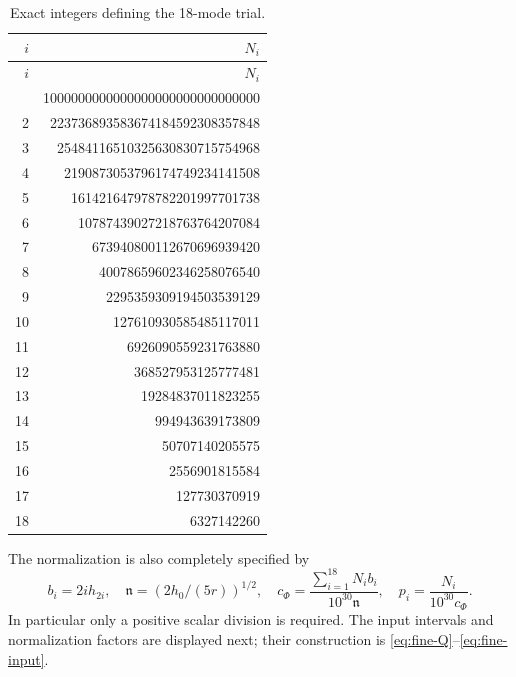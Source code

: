 {\small
\setlength{\tabcolsep}{3pt}
\begin{longtable}{rr}
\caption{Exact integers defining the 18-mode trial.}\label{tab:trial-integers}\\
\toprule $i$ & $N_i$\\ \midrule
\endfirsthead
\toprule $i$ & $N_i$\\ \midrule
\endhead
\bottomrule\endfoot
1 & 1000000000000000000000000000000\\
2 & 223736893583674184592308357848\\
3 & 25484116510325630830715754968\\
4 & 2190873053796174749234141508\\
5 & 161421647978782201997701738\\
6 & 10787439027218763764207084\\
7 & 673940800112670696939420\\
8 & 40078659602346258076540\\
9 & 2295359309194503539129\\
10 & 127610930585485117011\\
11 & 6926090559231763880\\
12 & 368527953125777481\\
13 & 19284837011823255\\
14 & 994943639173809\\
15 & 50707140205575\\
16 & 2556901815584\\
17 & 127730370919\\
18 & 6327142260\\
\end{longtable}
}

The normalization is also completely specified by
\[
 b_i=2ih_{2i},\quad \mathfrak n=(2h_0/(5r))^{1/2},\quad
 c_\Phi=\frac{\sum_{i=1}^{18}N_ib_i}{10^{30}\mathfrak n},\quad
 p_i=\frac{N_i}{10^{30}c_\Phi}.
\]
In particular only a positive scalar division is required. The input intervals
and normalization factors are displayed next; their construction is
\eqref{eq:fine-Q}--\eqref{eq:fine-input}.

